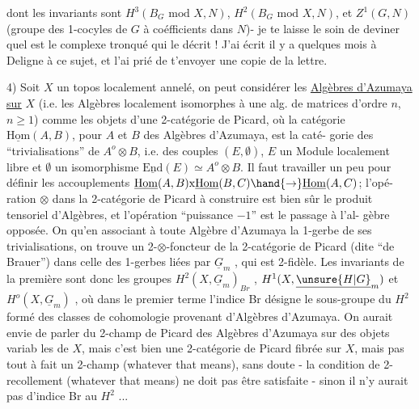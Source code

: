 
dont les invariants sont $H^3(B_G \text{ mod } X,N)$, $H^2(B_G \text{ mod } X,N)$, et $Z^1(G,N)$ (groupe
des 1-cocyles de $G$ à coéfficients dans $N$)- je te laisse le soin de deviner
quel est le complexe tronqué qui le décrit ! J'ai écrit il y a quelques
mois à Deligne à ce sujet, et l'ai prié de t'envoyer une copie de 
la lettre.

4) Soit $X$ un topos localement annelé, on peut considérer les \uline{Algèbres
d'Azumaya sur} $X$ (i.e. les Algèbres localement isomorphes à une alg. de
matrices d'ordre $n$, $n \geq 1$) comme les objets d'une 2-catégorie de Picard,
où la catégorie $\underline{\mathrm{Hom}}(A,B)$, pour $A$ et $B$ des Algèbres d'Azumaya, est la caté-%
gorie des ``trivialisations'' de $A^o\otimes B$, i.e. des couples $(E,\emptyset)$, $E$ un Module
localement libre et $\emptyset$ un isomorphisme $\underline{\mathrm{End}}(E)\simeq A^o\otimes B$. Il faut travailler
un peu pour définir les accouplements $\underline{\mathrm{Hom}}(A,B)\mathrm{x}\underline{\mathrm{Hom}}(B,C)\hand{\to}\underline{\mathrm{Hom}}(A,C)$; l'opé-%
ration $\otimes$ dans la 2-catégorie de Picard à construire est bien sûr le produit
tensoriel d'Algèbres, et l'opération ``puissance $-1$'' est le passage à l'al-%
gèbre opposée. On  qu'en
associant à toute Algèbre d'Azumaya la 1-gerbe de ses trivialisations, on
trouve un 2-$\otimes$-foncteur de la 2-catégorie de Picard (dite ``de Brauer'') dans
celle des 1-gerbes liées par $\underline{G}_m$ , qui est 2-fidèle. Les invariants de
la première sont donc les groupes $H^2(X,\underline{G}_m)_{Br}$ , $H^1(X,\underline{\unsure{H|G}}_m)$ et $H^o(X,\underline{G}_m)$ , où
dans le premier terme l'indice Br désigne le sous-groupe du $H^2$ formé des
classes de cohomologie provenant d'Algèbres d'Azumaya. On aurait envie
de parler du 2-champ de Picard des Algèbres d'Azumaya sur des objets variab
les de $X$, mais c'est bien une 2-catégorie de Picard fibrée sur $X$, mais pas
tout à fait un 2-champ (whatever that means), sans doute - la condition de
2-recollement (whatever that means) ne doit pas être satisfaite - sinon il
n'y aurait pas d'indice Br au $H^2$ ...

